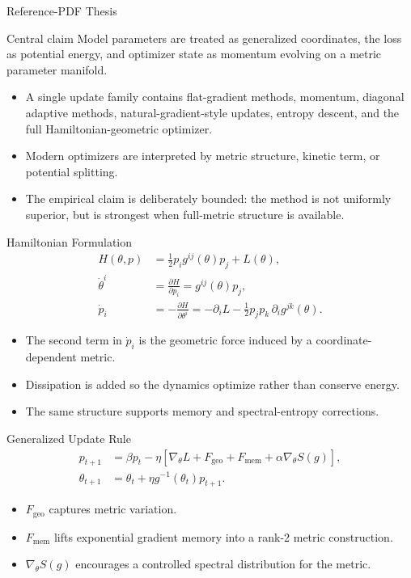 \documentclass[aspectratio=169,11pt]{beamer}
\begin{document}
\begin{frame}{Reference-PDF Thesis}
  \begin{block}{Central claim}
    Model parameters are treated as generalized coordinates, the loss as potential energy,
    and optimizer state as momentum evolving on a metric parameter manifold.
  \end{block}
  \begin{itemize}
    \item A single update family contains flat-gradient methods, momentum, diagonal adaptive methods,
      natural-gradient-style updates, entropy descent, and the full Hamiltonian-geometric optimizer.
    \item Modern optimizers are interpreted by metric structure, kinetic term, or potential splitting.
    \item The empirical claim is deliberately bounded: the method is not uniformly superior, but is
      strongest when full-metric structure is available.
  \end{itemize}
\end{frame}

\begin{frame}{Hamiltonian Formulation}
  \small
  \begin{align*}
    H(\theta,p) &= \frac{1}{2}p_i g^{ij}(\theta)p_j + L(\theta),\\
    \dot{\theta}^{i} &= \frac{\partial H}{\partial p_i}
      = g^{ij}(\theta)p_j,\\
    \dot{p}_i &= -\frac{\partial H}{\partial \theta^i}
      = -\partial_i L
      - \frac{1}{2}p_j p_k\,\partial_i g^{jk}(\theta).
  \end{align*}
  \begin{itemize}
    \item The second term in $\dot p_i$ is the geometric force induced by a coordinate-dependent metric.
    \item Dissipation is added so the dynamics optimize rather than conserve energy.
    \item The same structure supports memory and spectral-entropy corrections.
  \end{itemize}
\end{frame}

\begin{frame}{Generalized Update Rule}
  \small
  \begin{align*}
    p_{t+1} &= \beta p_t - \eta\left[\nabla_\theta L
      + F_{\mathrm{geo}} + F_{\mathrm{mem}}
      + \alpha\nabla_\theta S(g)\right],\\
    \theta_{t+1} &= \theta_t + \eta g^{-1}(\theta_t)p_{t+1}.
  \end{align*}
  \begin{itemize}
    \item $F_{\mathrm{geo}}$ captures metric variation.
    \item $F_{\mathrm{mem}}$ lifts exponential gradient memory into a rank-2 metric construction.
    \item $\nabla_\theta S(g)$ encourages a controlled spectral distribution for the metric.
  \end{itemize}
\end{frame}
\end{document}
